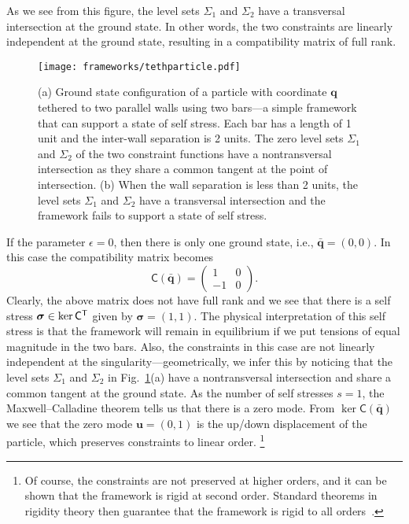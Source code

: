 \begin{example*}
As we see from this figure, the level sets $\Sigma_{1}$ and $\Sigma_{2}$ have a transversal intersection at the ground state.
In other words, the two constraints are linearly independent at the ground state, resulting in a compatibility matrix of full rank.
%
\begin{figure}
  \begin{center}
    \texttt{[image: frameworks/tethparticle.pdf]}
  \end{center}
  \caption{(a) Ground state configuration of a particle with coordinate $\bm{q}$ tethered to two parallel walls using two bars---a simple framework that can support a state of self stress.
    Each bar has a length of 1 unit and the inter-wall separation is 2 units.
  The zero level sets $\Sigma_1$ and $\Sigma_2$ of the two constraint functions have a nontransversal intersection as they share a common tangent at the point of intersection.
  (b) When the wall separation is less than 2 units, the level sets $\Sigma_{1}$ and $\Sigma_{2}$ have a transversal intersection and the framework fails to support a state of self stress.
}
  \label{fig:tether}
\end{figure}

If the parameter $\epsilon = 0$, then there is only one ground state, i.e., $\bm{\bar{q}} = (0, 0)$.
In this case the compatibility matrix becomes
%
\begin{equation}
  \mathsf{C}(\bar{\bm{q}}) =
  \begin{pmatrix}
    1 & 0\\
    -1 & 0
  \end{pmatrix}.
\end{equation}
%
Clearly, the above matrix does not have full rank and we see that there is a self stress $\bm{\sigma} \in \ker \mathsf{C}^\mathsf{T}$ given by $\bm{\sigma} = \left(1, 1\right)$.
The physical interpretation of this self stress is that the framework will remain in equilibrium if we put tensions of equal magnitude in the two bars.
Also, the constraints in this case are not linearly independent at the singularity---geometrically, we infer this by noticing that the level sets $\Sigma_{1}$ and $\Sigma_{2}$ in Fig.~\ref{fig:tether}(a) have a nontransversal intersection and share a common tangent at the ground state.
As the number of self stresses $s = 1$, the Maxwell--Calladine theorem tells us that there is a zero mode.
From $\ker\mathsf{C}(\bar{\bm{q}})$ we see that the zero mode $\bm{u} = (0, 1)$ is the up/down displacement of the particle, which preserves constraints to linear order.%
\footnote{Of course, the constraints are not preserved at higher orders, and it can be shown that the framework is rigid at second order.  Standard theorems in rigidity theory then guarantee that the framework is rigid to all orders~\cite{connelly2022}.}
\end{example*}

